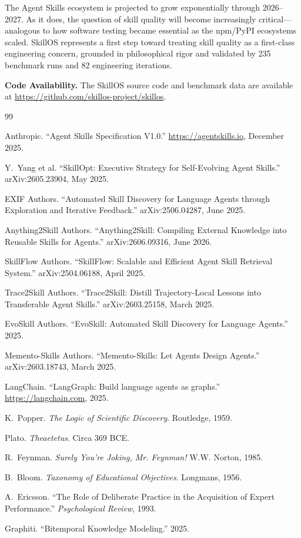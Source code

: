 \documentclass[11pt]{article}
\begin{document}
The Agent Skills ecosystem is projected to grow exponentially through 2026--2027. As it does, the question of skill quality will become increasingly critical---analogous to how software testing became essential as the npm/PyPI ecosystems scaled. SkillOS represents a first step toward treating skill quality as a first-class engineering concern, grounded in philosophical rigor and validated by 235 benchmark runs and 82 engineering iterations.

\vspace{6pt}
\noindent\textbf{Code Availability.} The SkillOS source code and benchmark data are available at \url{https://github.com/skillos-project/skillos}.

\begin{thebibliography}{99}

Anthropic. ``Agent Skills Specification V1.0.'' \url{https://agentskills.io}, December 2025.

Y.~Yang et al. ``SkillOpt: Executive Strategy for Self-Evolving Agent Skills.'' arXiv:2605.23904, May 2025.

EXIF Authors. ``Automated Skill Discovery for Language Agents through Exploration and Iterative Feedback.'' arXiv:2506.04287, June 2025.

Anything2Skill Authors. ``Anything2Skill: Compiling External Knowledge into Reusable Skills for Agents.'' arXiv:2606.09316, June 2026.

SkillFlow Authors. ``SkillFlow: Scalable and Efficient Agent Skill Retrieval System.'' arXiv:2504.06188, April 2025.

Trace2Skill Authors. ``Trace2Skill: Distill Trajectory-Local Lessons into Transferable Agent Skills.'' arXiv:2603.25158, March 2025.

EvoSkill Authors. ``EvoSkill: Automated Skill Discovery for Language Agents.'' 2025.

Memento-Skills Authors. ``Memento-Skills: Let Agents Design Agents.'' arXiv:2603.18743, March 2025.

LangChain. ``LangGraph: Build language agents as graphs.'' \url{https://langchain.com}, 2025.

K.~Popper. \textit{The Logic of Scientific Discovery}. Routledge, 1959.

Plato. \textit{Theaetetus}. Circa 369 BCE.

R.~Feynman. \textit{Surely You're Joking, Mr. Feynman!} W.W. Norton, 1985.

B.~Bloom. \textit{Taxonomy of Educational Objectives}. Longmans, 1956.

A.~Ericsson. ``The Role of Deliberate Practice in the Acquisition of Expert Performance.'' \textit{Psychological Review}, 1993.

Graphiti. ``Bitemporal Knowledge Modeling.'' 2025.

\end{thebibliography}
\end{document}
